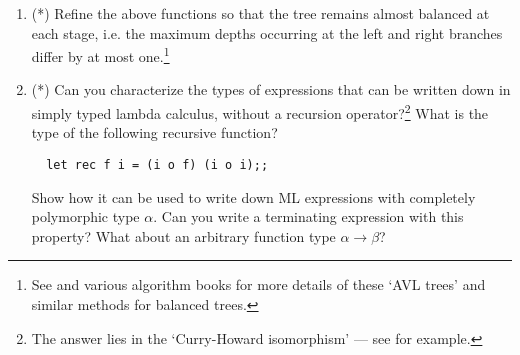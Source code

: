 \begin{enumerate}
\item (*) Refine the above functions so that the tree remains almost balanced
at each stage, i.e. the maximum depths occurring at the left and right branches
differ by at most one.\footnote{See  and various algorithm books for
more details of these `AVL trees' and similar methods for balanced trees.}

\item (*) Can you characterize the types of expressions that can be written
down in simply typed lambda calculus, without a recursion
operator?\footnote{The answer lies in the `Curry-Howard isomorphism' --- see
 for example.} What is the type of the following recursive
function?

\begin{boxed}\begin{verbatim}
  let rec f i = (i o f) (i o i);;
\end{verbatim}\end{boxed}

Show how it can be used to write down ML expressions with completely
polymorphic type $\alpha$. Can you write a terminating expression with this
property? What about an arbitrary function type $\alpha \to \beta$?

\end{enumerate}
